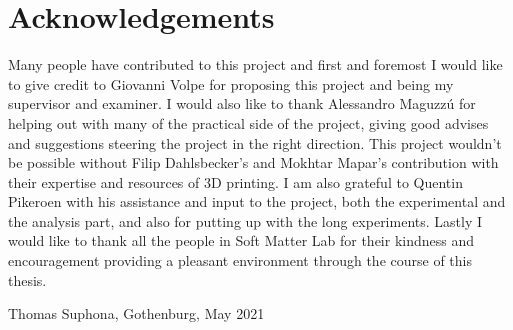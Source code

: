 \thispagestyle{plain}			%
\section*{Acknowledgements}
Many people have contributed to this project and first and foremost I would like to give credit to 
Giovanni Volpe for proposing this project and being my supervisor and examiner. I would also like to thank 
Alessandro Maguzzú for helping out with many of the practical side of the project, giving good advises 
and suggestions steering the project in the right direction. This project wouldn't be possible 
without Filip Dahlsbecker's and Mokhtar Mapar's contribution with their expertise and resources of 3D printing. 
I am also grateful to Quentin Pikeroen with his assistance and input to the project, both the experimental 
and the analysis part, and also for putting up with the long experiments.
Lastly I would like to thank all the people in Soft Matter Lab for their kindness and encouragement 
providing a pleasant environment through the course of this thesis. 


\vspace{1.5cm}
\hfill
Thomas Suphona, Gothenburg, May 2021

\newpage				%
\thispagestyle{empty}
\mbox{}

